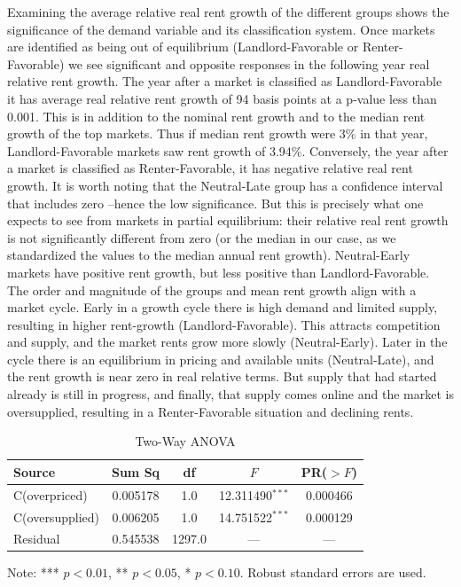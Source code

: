 \documentclass[APA,Times1COL]{WileyNJDv5} %
\begin{document}
Examining the average relative real rent growth of the different groups shows the significance of the demand variable and its classification system. Once markets are identified as being out of equilibrium (Landlord-Favorable or Renter-Favorable) we see significant and opposite responses in the following year real relative rent growth. The year after a market is classified as Landlord-Favorable it has average real relative rent growth of 94 basis points at a p-value less than 0.001. This is in addition to the nominal rent growth and to the median rent growth of the top markets. Thus if median rent growth were 3\% in that year, Landlord-Favorable markets saw rent growth of 3.94\%. Conversely, the year after a market is classified as Renter-Favorable, it has negative relative real rent growth. 
It is worth noting that the Neutral-Late group has a confidence interval that includes zero --hence the low significance. But this is precisely what one expects to see from markets in partial equilibrium: their relative real rent growth is not significantly different from zero (or the median in our case, as we standardized the values to the median annual rent growth). 
Neutral-Early markets have positive rent growth, but less positive than Landlord-Favorable. The order and magnitude of the groups and mean rent growth align with a market cycle. Early in a growth cycle there is high demand and limited supply, resulting in higher rent-growth  (Landlord-Favorable). This attracts competition and supply, and the market rents grow more slowly (Neutral-Early). Later in the cycle there is an equilibrium in pricing and available units (Neutral-Late), and the rent growth is near zero in real relative terms. But supply that had started already is still in progress, and finally, that supply comes online and the market is oversupplied, resulting in a Renter-Favorable situation and declining rents. 

\begin{table}[ht]
	\centering
	\begin{threeparttable}
		\caption{Two-Way ANOVA\label{tab:anova}}
		\begin{tabular}{lcccc}
			\toprule
			Source              & Sum Sq   & df    & $F$      & PR($>F$) \\
			\midrule
			C(overpriced)       & 0.005178 & 1.0   & 12.311490$^{***}$  & 0.000466 \\
			C(oversupplied)     & 0.006205 & 1.0   & 14.751522$^{***}$  & 0.000129 \\
			Residual            & 0.545538 & 1297.0& ---      & --- \\
			\bottomrule
		\end{tabular}
		\begin{tablenotes}
			\footnotesize
			\item Note: *** $p<0.01$, ** $p<0.05$, * $p<0.10$. Robust standard errors are used.
		\end{tablenotes}
	\end{threeparttable}
\end{table}
\end{document}
